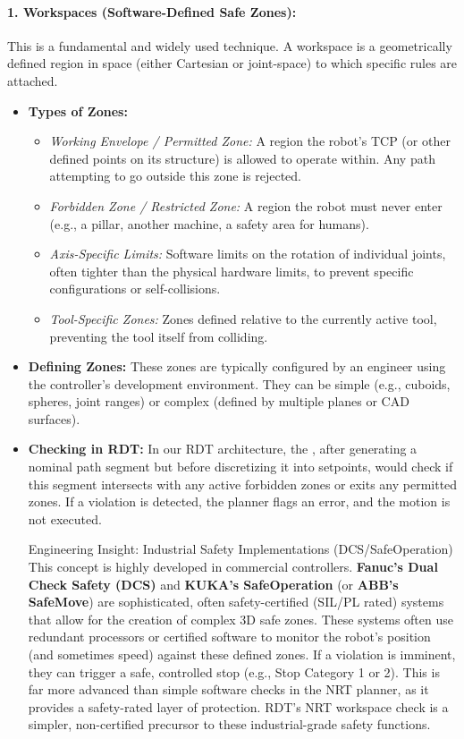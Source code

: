 \paragraph{ \textbf{1. Workspaces (Software-Defined Safe Zones):}}
    This is a fundamental and widely used technique. A workspace is a geometrically defined region in space (either Cartesian or joint-space) to which specific rules are attached.
    \begin{itemize}
        \item \textbf{Types of Zones:}
            \begin{itemize}
                \item \textit{Working Envelope / Permitted Zone:} A region the robot's TCP (or other defined points on its structure) is allowed to operate within. Any path attempting to go outside this zone is rejected.
                \item \textit{Forbidden Zone / Restricted Zone:} A region the robot must never enter (e.g., a pillar, another machine, a safety area for humans).
                \item \textit{Axis-Specific Limits:} Software limits on the rotation of individual joints, often tighter than the physical hardware limits, to prevent specific configurations or self-collisions.
                \item \textit{Tool-Specific Zones:} Zones defined relative to the currently active tool, preventing the tool itself from colliding.
            \end{itemize}
        \item \textbf{Defining Zones:} These zones are typically configured by an engineer using the controller's development environment. They can be simple (e.g., cuboids, spheres, joint ranges) or complex (defined by multiple planes or CAD surfaces).
        \item \textbf{Checking in RDT:} In our RDT architecture, the , after generating a nominal path segment but before discretizing it into setpoints, would check if this segment intersects with any active forbidden zones or exits any permitted zones. If a violation is detected, the planner flags an error, and the motion is not executed.
\begin{tipbox}{Engineering Insight: Industrial Safety Implementations (DCS/SafeOperation)} %
This concept is highly developed in commercial controllers. \textbf{Fanuc's Dual Check Safety (DCS)} and \textbf{KUKA's SafeOperation} (or \textbf{ABB's SafeMove}) are sophisticated, often safety-certified (SIL/PL rated) systems that allow for the creation of complex 3D safe zones. These systems often use redundant processors or certified software to monitor the robot's position (and sometimes speed) against these defined zones. If a violation is imminent, they can trigger a safe, controlled stop (e.g., Stop Category 1 or 2). This is far more advanced than simple software checks in the NRT planner, as it provides a safety-rated layer of protection. RDT's NRT workspace check is a simpler, non-certified precursor to these industrial-grade safety functions.
\end{tipbox}
    \end{itemize}

